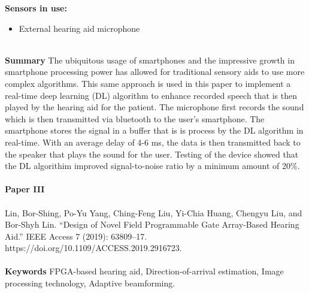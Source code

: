 \noindent
\textbf{Sensors in use:}
\begin{itemize}
    \item External hearing aid microphone \\ \\
\end{itemize}

\noindent
\textbf{Summary} The ubiquitous usage of smartphones and the impressive growth in smartphone processing power has allowed for traditional sensory aids to use more complex algorithms. This same approach is used in this paper to implement a real-time deep learning (DL) algorithm to enhance recorded speech that is then played by the hearing aid for the patient. The microphone first records the sound which is then transmitted via bluetooth to the user's smartphone. The smartphone stores the signal in a buffer that is is process by the DL algorithm in real-time. With an average delay of 4-6 ms, the data is then transmitted back to the speaker that plays the sound for the user. Testing of the device showed that the DL algorithim improved signal-to-noise ratio by a minimum amount of 20\%. \\ \\


\textbf{Paper III} 
\\ \\
\noindent
Lin, Bor-Shing, Po-Yu Yang, Ching-Feng Liu, Yi-Chia Huang, Chengyu Liu, and Bor-Shyh Lin. “Design of Novel Field Programmable Gate Array-Based Hearing Aid.” IEEE Access 7 (2019): 63809–17. https://doi.org/10.1109/ACCESS.2019.2916723. \\ \\

\noindent
\textbf{Keywords} FPGA-based hearing aid, Direction-of-arrival estimation, Image processing technology, Adaptive beamforming. \\ \\

